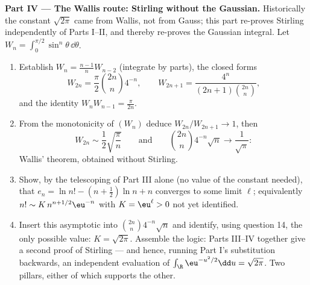 \begin{problem}
\medskip
\noindent\textbf{Part IV --- The Wallis route: Stirling
without the Gaussian.} Historically the constant $\sqrt{2\pi}$
came from Wallis, not from Gauss; this part re-proves Stirling
independently of Parts I--II, and thereby re-proves the
Gaussian integral. Let $W_n = \int_0^{\pi/2}\sin^n\theta\,
\dd\theta$.
\begin{enumerate}[resume]
  \item Establish $W_n = \frac{n-1}nW_{n-2}$ (integrate by
        parts), the closed forms
        \[
        W_{2n} = \frac\pi2\binom{2n}n4^{-n}, \qquad
        W_{2n+1} = \frac{4^n}{(2n+1)\binom{2n}n},
        \]
        and the identity $W_nW_{n-1} = \frac\pi{2n}$.
  \item From the monotonicity of $(W_n)$ deduce
        $W_{2n}/W_{2n+1} \to 1$, then
        \[
        W_{2n} \sim \frac12\sqrt{\frac\pi n}
        \qquad\text{and}\qquad
        \binom{2n}n4^{-n}\sqrt n \longrightarrow
        \frac1{\sqrt\pi} :
        \]
        Wallis' theorem, obtained without Stirling.
  \item Show, by the telescoping of Part III alone (no value
        of the constant needed), that $e_n = \ln n! - (n +
        \frac12)\ln n + n$ converges to some limit $\ell$;
        equivalently $n! \sim K\,n^{n+1/2}\eu^{-n}$ with $K =
        \eu^\ell > 0$ not yet identified.
  \item Insert this asymptotic into $\binom{2n}n4^{-n}\sqrt n$
        and identify, using question 14, the only possible
        value: $K = \sqrt{2\pi}$. Assemble the logic: Parts
        III--IV together give a  second proof of
        Stirling --- and hence, running Part I's substitution
        backwards, an independent evaluation of
        $\int_\R\eu^{-u^2/2}\dd u = \sqrt{2\pi}$. Two pillars,
        either of which supports the other.
\end{enumerate}


\end{problem}
